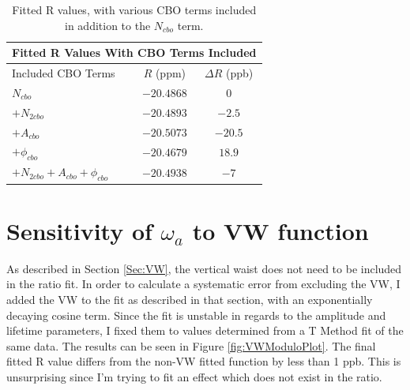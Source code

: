 			\begin{table}[H]
			\centering
			\setlength\tabcolsep{10pt}
			\renewcommand{\arraystretch}{1.2}
			\begin{tabular*}{.7\linewidth}{@{\extracolsep{\fill}}|lcc|}
			  \hline
			  	\multicolumn{3}{|c|}{\textbf{Fitted R Values With CBO Terms Included}} \\
			  \hline\hline
    			Included CBO Terms & $R$ (ppm) & $\Delta R$ (ppb) \\
			  \hline
				$N_{cbo}$ 							& $-20.4868$ & $0$ \\
				$+N_{2cbo}$ 						& $-20.4893$ & $-2.5$ \\
				$+A_{cbo}$ 							& $-20.5073$ & $-20.5$ \\
				$+\phi_{cbo}$ 						& $-20.4679$ & $18.9$ \\
				$+N_{2cbo}+A_{cbo}+\phi_{cbo}$	   	& $-20.4938$ & $-7$ \\
			  \hline
			\end{tabular*}
			\caption{Fitted R values, with various CBO terms included in addition to the $N_{cbo}$ term.}
			\label{Tab:ExtraCBOTerms}
			\end{table}



\section{Sensitivity of \texorpdfstring{$\omega_{a}$}{} to VW function}
\label{Sec:SystematicVW}

	As described in Section \ref{Sec:VW}, the vertical waist does not need to be included in the ratio fit. In order to calculate a systematic error from excluding the VW, I added the VW to the fit as described in that section, with an exponentially decaying cosine term. Since the fit is unstable in regards to the amplitude and lifetime parameters, I fixed them to values determined from a T Method fit of the same data. The results can be seen in Figure \ref{fig:VWModuloPlot}. The final fitted R value differs from the non-VW fitted function by less than 1 ppb. This is unsurprising since I'm trying to fit an effect which does not exist in the ratio.

